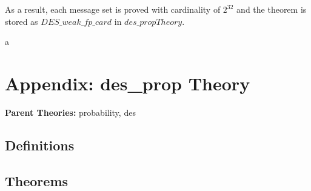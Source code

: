 \documentclass{article}
\begin{document}
As a result, each message set is proved with cardinality of $2^{32}$ and the theorem is stored as
$DES\_weak\_fp\_card$ in $des\_propTheory$.

\begin{alltt}
   \HOLTokenTurnstile{}    \HOLSymConst{\HOLTokenImp{}}   \HOLSymConst{=}  \HOLSymConst{\HOLTokenExp{}} 
\end{alltt}

a




\section{Appendix: des\_prop Theory}
\begin{flushleft}
\textbf{Parent Theories:} probability, des
\end{flushleft}


\subsection{Definitions}

\HOLdesXXpropDefinitions

\subsection{Theorems}

\HOLdesXXpropTheorems
\end{document}
